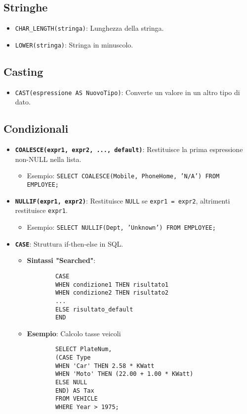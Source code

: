 \documentclass{article}
\begin{document}
	\subsection{Stringhe}
	\begin{itemize}
		\item \texttt{CHAR\_LENGTH(stringa)}: Lunghezza della stringa.
		\item \texttt{LOWER(stringa)}: Stringa in minuscolo.
	\end{itemize}
	
	\subsection{Casting}
	\begin{itemize}
		\item \texttt{CAST(espressione AS NuovoTipo)}: Converte un valore in un altro tipo di dato.
	\end{itemize}
	
	\subsection{Condizionali}
	\begin{itemize}
		\item \textbf{\texttt{COALESCE(expr1, expr2, ..., default)}}: Restituisce la prima espressione non-NULL nella lista.
		\begin{itemize}
			\item Esempio: \texttt{SELECT COALESCE(Mobile, PhoneHome, 'N/A') FROM EMPLOYEE;}
		\end{itemize}
		\item \textbf{\texttt{NULLIF(expr1, expr2)}}: Restituisce \texttt{NULL} se \texttt{expr1 = expr2}, altrimenti restituisce \texttt{expr1}.
		\begin{itemize}
			\item Esempio: \texttt{SELECT NULLIF(Dept, 'Unknown') FROM EMPLOYEE;}
		\end{itemize}
		\item \textbf{\texttt{CASE}}: Struttura if-then-else in SQL.
		\begin{itemize}
			\item \textbf{Sintassi "Searched"}:
			\begin{verbatim}
		CASE
		WHEN condizione1 THEN risultato1
		WHEN condizione2 THEN risultato2
		...
		ELSE risultato_default
		END
			\end{verbatim}
			\item \textbf{Esempio}: Calcolo tasse veicoli
			\begin{verbatim}
		SELECT PlateNum,
		(CASE Type
		WHEN 'Car' THEN 2.58 * KWatt
		WHEN 'Moto' THEN (22.00 + 1.00 * KWatt)
		ELSE NULL
		END) AS Tax
		FROM VEHICLE
		WHERE Year > 1975;
			\end{verbatim}
		\end{itemize}
	\end{itemize}
	
\end{document}
